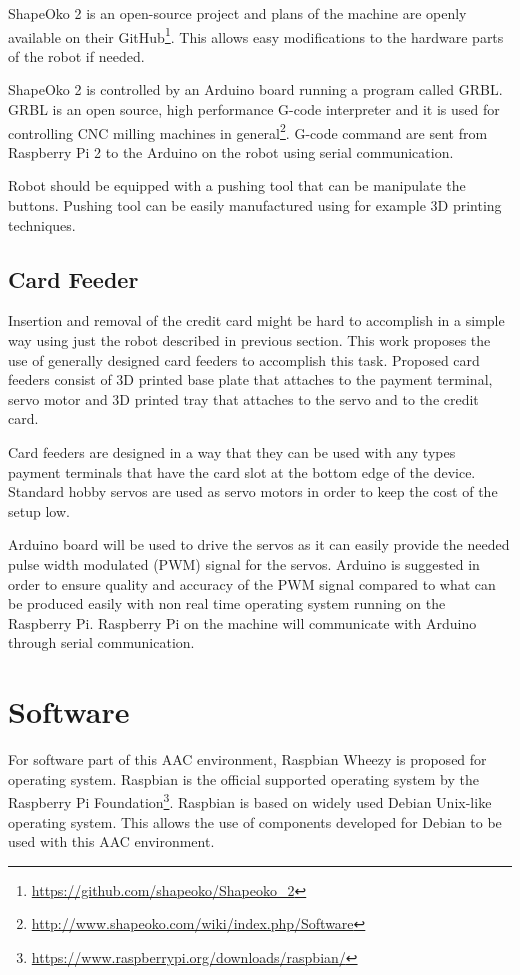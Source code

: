 ShapeOko 2 is an open-source project and plans of the machine are openly available on their GitHub\footnote{\url{https://github.com/shapeoko/Shapeoko_2}}. This allows easy modifications to the hardware parts of the robot if needed.

ShapeOko 2 is controlled by an Arduino board running a program called GRBL. GRBL is an open source, high performance G-code interpreter and it is used for controlling CNC milling machines in general\footnote{\url{http://www.shapeoko.com/wiki/index.php/Software}}. G-code command are sent from Raspberry Pi 2 to the Arduino on the robot using serial communication.

Robot should be equipped with a pushing tool that can be manipulate the buttons. Pushing tool can be easily manufactured using for example 3D printing techniques.

\FloatBarrier
\subsection{Card Feeder}
\label{subsection:Card feeder}

Insertion and removal of the credit card might be hard to accomplish in a simple way using just the robot described in previous section. This work proposes the use of generally designed card feeders to accomplish this task. Proposed card feeders consist of 3D printed base plate that attaches to the payment terminal, servo motor and 3D printed tray that attaches to the servo and to the credit card.

Card feeders are designed in a way that they can be used with any types payment terminals that have the card slot at the bottom edge of the device. Standard hobby servos are used as servo motors in order to keep the cost of the setup low.

Arduino board will be used to drive the servos as it can easily provide the needed pulse width modulated (PWM) signal for the servos. Arduino is suggested in order to ensure quality and accuracy of the PWM signal compared to what can be produced easily with non real time operating system running on the Raspberry Pi. Raspberry Pi on the machine will communicate with Arduino through serial communication.

\section{Software}

For software part of this AAC environment, Raspbian Wheezy is proposed for operating system. Raspbian is the official supported operating system by the Raspberry Pi Foundation\footnote{\url{https://www.raspberrypi.org/downloads/raspbian/}}. Raspbian is based on widely used Debian Unix-like operating system. This allows the use of components developed for Debian to be used with this AAC environment.

